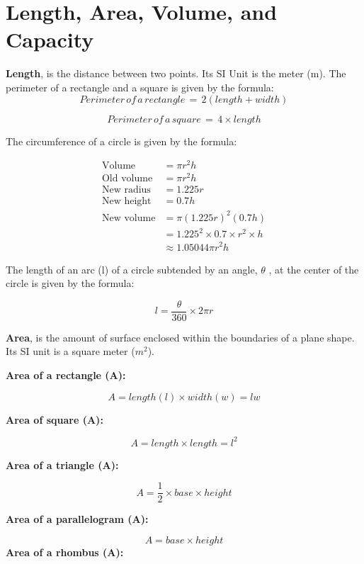 \documentclass[
  a4paperpaper,
]{scrbook}
\begin{document}

\chapter*{Length, Area, Volume, and
Capacity}\label{length-area-volume-and-capacity}


\textbf{Length}, is the distance between two points. Its SI Unit is the
meter (m). The perimeter of a rectangle and a square is given by the
formula: \[ Perimeter\, of \,a \,rectangle\,=\,2(length+width)\]

\[Perimeter \,of \,a \,square\,=\,4 \times length\]

The circumference of a circle is given by the formula:

\begin{align}
\text{Volume} & = \pi r^2 h \\ 
\text{Old volume} & = \pi r^2 h \\ 
\text{New radius} & = 1.225r \\ 
\text{New height} & = 0.7h \\ 
\text{New volume} & = \pi(1.225r)^2(0.7h) \\ 
& = 1.225^2 \times 0.7 \times r^2 \times h \\ 
& \approx 1.05044 \pi r^2 h 
\end{align}

The length of an arc (l) of a circle subtended by an angle, \(\theta\) ,
at the center of the circle is given by the formula:

\[ l=\frac{\theta}{360}\times 2\pi r\]

\textbf{Area}, is the amount of surface enclosed within the boundaries
of a plane shape. Its SI unit is a square meter (\(m^2\)).

\textbf{Area of a rectangle (A):}

\[A=length (l)\times width(w)=lw\]

\textbf{Area of square (A):}

\[A=length \times length= l^2\]

\textbf{Area of a triangle (A): }

\[A=\frac{1}{2} \times base \times height\]

\textbf{Area of a parallelogram (A):}

\[A=base \times height\] \textbf{Area of a rhombus (A):}
\end{document}
